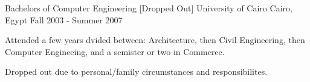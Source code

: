 

\begin{cventries}

  \cventry
    {Bachelors of Computer Engineering [Dropped Out]} %
    {University of Cairo} %
    {Cairo, Egypt} %
    {Fall 2003 - Summer 2007} %
    {
      \begin{cvitems} %
        \item {Attended a few years dvided between: Architecture, then Civil Engineering, then Computer Engineeing, and a semister or two in Commerce.}
        \item{Dropped out due to personal/family circumstances and responsibilites.}
      \end{cvitems}
    }

\end{cventries}
